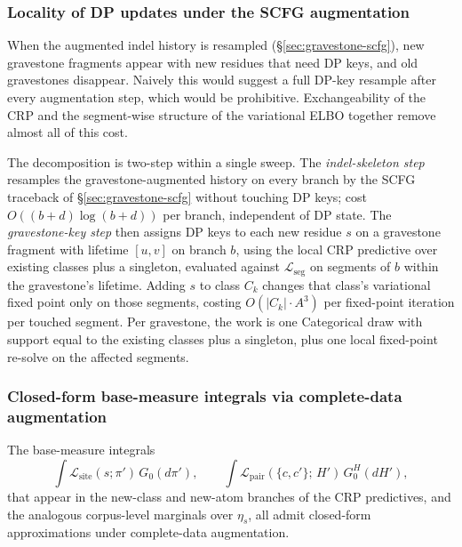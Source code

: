 \subsubsection*{Locality of DP updates under the SCFG augmentation}

When the augmented indel history is resampled
(\S\ref{sec:gravestone-scfg}), new gravestone fragments appear with
new residues that need DP keys, and old gravestones disappear.
Naively this would suggest a full DP-key resample after every
augmentation step, which would be prohibitive. Exchangeability of
the CRP and the segment-wise structure of the variational ELBO
together remove almost all of this cost.

The decomposition is two-step within a single sweep. The
\emph{indel-skeleton step} resamples the gravestone-augmented history
on every branch by the SCFG traceback of \S\ref{sec:gravestone-scfg}
without touching DP keys; cost $O((b + d) \log(b + d))$ per branch,
independent of DP state. The \emph{gravestone-key step} then
assigns DP keys to each new residue $s$ on a gravestone fragment
with lifetime $[u, v]$ on branch $b$, using the local CRP
predictive over existing classes plus a singleton, evaluated against
$\mathcal{L}_{\text{seg}}$ on segments of $b$ within the gravestone's
lifetime. Adding $s$ to class $C_k$ changes that class's variational
fixed point only on those segments, costing $O(|C_k| \cdot A^3)$
per fixed-point iteration per touched segment. Per gravestone, the
work is one Categorical draw with support equal to the existing
classes plus a singleton, plus one local fixed-point re-solve on
the affected segments.

\subsubsection*{Closed-form base-measure integrals via complete-data augmentation}
\label{sec:base-measure-conj}

The base-measure integrals
\[
    \int \mathcal{L}_{\text{site}}(s; \pi')\, G_0(d\pi'), \qquad
    \int \mathcal{L}_{\text{pair}}(\{c, c'\};\, H')\, G_0^H(dH'),
\]
that appear in the new-class and new-atom branches of the CRP
predictives, and the analogous corpus-level marginals over
$\eta_s$, all admit closed-form approximations under complete-data
augmentation.

